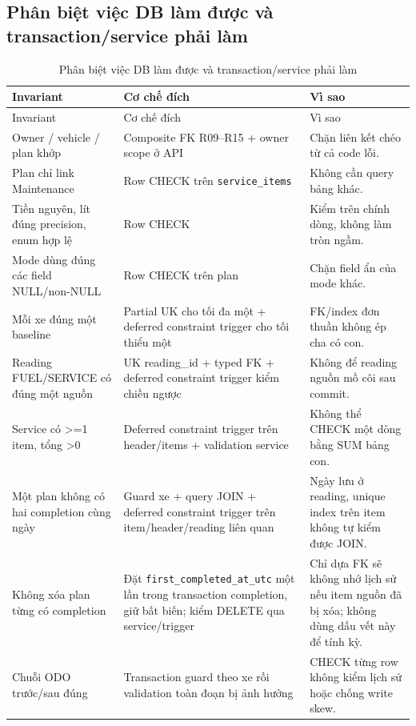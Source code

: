 \subsection{Phân biệt việc DB làm được và transaction/service phải làm}
\begin{smalltable}\begin{longtable}{L{3.0cm}L{3.2cm}L{8.2cm}}
\caption{Phân biệt việc DB làm được và transaction/service phải làm}\label{tab:dictionary-15}\\\toprule
Invariant & Cơ chế đích & Vì sao\\\midrule\endfirsthead
\toprule Invariant & Cơ chế đích & Vì sao\\\midrule\endhead
Owner / vehicle / plan khớp & Composite FK R09–R15 + owner scope ở API & Chặn liên kết chéo từ cả code lỗi.\\
Plan chỉ link Maintenance & Row CHECK trên \texttt{service\_\allowbreak{}items} & Không cần query bảng khác.\\
Tiền nguyên, lít đúng precision, enum hợp lệ & Row CHECK & Kiểm trên chính dòng, không làm tròn ngầm.\\
Mode dùng đúng các field NULL/non-NULL & Row CHECK trên plan & Chặn field ẩn của mode khác.\\
Mỗi xe đúng một baseline & Partial UK cho tối đa một + deferred constraint trigger cho tối thiểu một & FK/index đơn thuần không ép cha có con.\\
Reading FUEL/SERVICE có đúng một nguồn & UK reading\_id + typed FK + deferred constraint trigger kiểm chiều ngược & Không để reading nguồn mồ côi sau commit.\\
Service có >=1 item, tổng >0 & Deferred constraint trigger trên header/items + validation service & Không thể CHECK một dòng bằng SUM bảng con.\\
Một plan không có hai completion cùng ngày & Guard xe + query JOIN + deferred constraint trigger trên item/header/reading liên quan & Ngày lưu ở reading, unique index trên item không tự kiểm được JOIN.\\
Không xóa plan từng có completion & Đặt \texttt{first\_\allowbreak{}completed\_\allowbreak{}at\_\allowbreak{}utc} một lần trong transaction completion, giữ bất biến; kiểm DELETE qua service/trigger & Chỉ dựa FK sẽ không nhớ lịch sử nếu item nguồn đã bị xóa; không dùng dấu vết này để tính kỳ.\\
Chuỗi ODO trước/sau đúng & Transaction guard theo xe rồi validation toàn đoạn bị ảnh hưởng & CHECK từng row không kiểm lịch sử hoặc chống write skew.\\

\end{longtable}
\end{smalltable}
